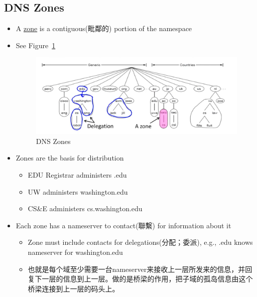 \documentclass[12pt]{ctexart}   %
\begin{document}
	 \subsection{DNS Zones}
	 \begin{itemize}
	 	\item A \underline{zone} is a contiguous(毗鄰的) portion of the namespace
	 	\item See Figure~\ref{fig:8-2-4}
		  
		 \begin{figure}[h!] %
		\centering
		 \includegraphics[scale=0.7]{images/8-2-4}
		\caption{ DNS Zones}
		 \label{fig:8-2-4}
		 \end{figure}
	 	 
		 \item Zones are the basis for distribution
		 \begin{itemize}
		 	\item EDU Registrar administers .edu
		 	\item UW administers washington.edu
		 	\item CS\&E administers cs.washington.edu
		 \end{itemize}
		 
		 \item Each zone has a nameserver to contact(聯繫) for information about it
		 \begin{itemize}
		 	\item Zone must include contacts for delegations(分配；委派), e.g., .edu knows nameserver for washington.edu
		 	\item 也就是每个域至少需要一台nameserver来接收上一层所发来的信息，并回复下一层的信息到上一层。做的是桥梁的作用，把子域的孤岛信息由这个桥梁连接到上一层的码头上。
		 \end{itemize}
	 \end{itemize}
	 
\end{document}
